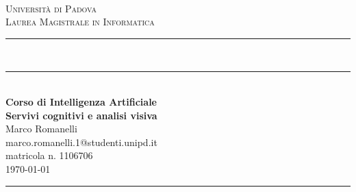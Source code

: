 \documentclass[fleqn,a4paper,11pt]{article}
\newcommand\HRule{\rule{\textwidth}{1pt}}
\newcommand\DRule{\rule{\textwidth}{.4pt}\\[\dimexpr-\baselineskip+1mm+2pt] \rule{\textwidth}{2pt}}
\begin{document}
\begin{titlepage}
\begin{center}
	\begin{minipage}{6in}
  		\centering
  		\hspace*{1.6in}
	\end{minipage}\\[1cm]
\textsc{\LARGE Universit\`a di Padova}\\[.2cm]
\textsc{\large Laurea Magistrale in Informatica}\\[.3cm]
\DRule \\[.5cm]
{\Large \bfseries Corso di Intelligenza Artificiale} \\[.4cm]
{\huge \bfseries Servivi cognitivi e analisi visiva} \\[.4cm]
{\Large Marco Romanelli} \\[.2cm]
{\footnotesize marco.romanelli.1@studenti.unipd.it} \\
{\footnotesize matricola n. 1106706} \\[1cm]
{\large \today}
\HRule \\[3cm]
\end{center}
\end{titlepage}




\end{document}
